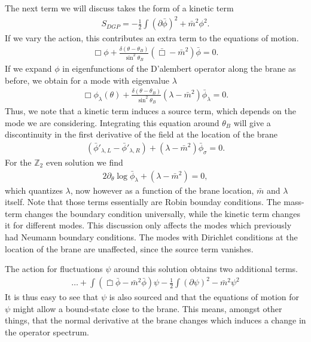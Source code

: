 The next term we will discuss takes the form of a kinetic term
\begin{align}
    S_{DGP} = - \frac 1 2 \int (\partial \bar \phi)^2 + \bar m^2 \phi^2.
\end{align}
If we vary the action, this contributes an extra term to the equations of motion.
\begin{align}
    \Box \phi + \frac{\delta(\theta - \theta_B)}{\sin^2 \theta_B} (\bar \Box - \bar m^2) \bar \phi = 0.
\end{align}
If we expand $\phi$ in eigenfunctions of the D'alembert operator along the brane as before, we obtain for a mode with eigenvalue $\lambda$
\begin{align}
    \Box \phi_\lambda(\theta) + \frac{\delta(\theta - \theta_B)}{\sin^2 \theta_B}  (\lambda - \bar m^2) \bar \phi_\lambda = 0.
\end{align}
Thus, we note that a kinetic term induces a source term, which depends on the mode we are considering. Integrating this equation around $\theta_B$ will give a discontinuity in the first derivative of the field at the location of the brane
\begin{align}
    (\bar \phi'_{\lambda,L} - \bar \phi'_{\lambda,R}) +  (\lambda - \bar m^2) \bar \phi_\sigma = 0.
\end{align}
For the $\mathbb Z_2$ even solution we find
\begin{align}
        2 \partial_\theta \log \bar \phi_{\lambda} +  (\lambda - \bar m^2) = 0,
\end{align}
which quantizes $\lambda$, now however as a function of the brane location, $\bar m$ and $\lambda$ itself. Note that those terms essentially are Robin bounday conditions. The mass-term changes the boundary condition universally, while the kinetic term changes it for different modes. This discussion only affects the modes which previously had Neumann boundary conditions. The modes with Dirichlet conditions at the location of the brane are unaffected, since the source term vanishes.


The action for fluctuations $\psi$ around this solution obtains two additional terms.
\begin{align}
    \dots + \int (\bar \Box \bar \phi - \bar m^2 \bar \phi ) \psi - \frac 1 2 \int (\partial \psi)^2 - \bar m^2 \psi^2
\end{align}
It is thus easy to see that $\psi$ is also sourced and that the equations of motion for $\psi$ might allow a bound-state close to the brane.
This means, amongst other things, that the normal derivative at the brane changes which induces a change in the operator spectrum.


